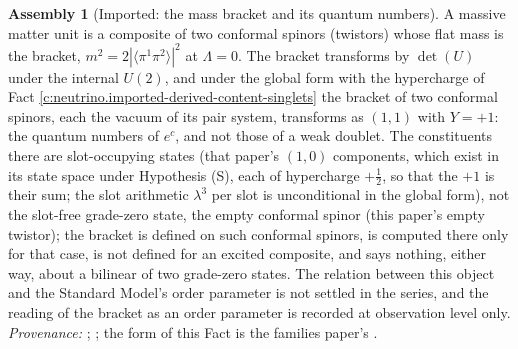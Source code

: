 \documentclass[11pt]{article}
\theoremstyle{definition}
\newtheorem{assembled}[theorem]{Assembly}
\theoremstyle{plain}
\newcommand{\changedmark}[2]{\marginpar{\raggedright\scriptsize\color{#1}#2}}
\providecommand{\br}{}\renewcommand{\br}[1]{\langle #1\rangle}
\begin{document}
\begin{assembled}[Imported: the mass bracket and its quantum numbers]\label{c:neutrino.imported-mass-bracket-quantum-numbers}
\changedmark{gray}{reworded}
A massive matter unit is a composite of two conformal spinors (twistors) whose flat mass is the bracket, $m^{2} = 2|\br{\pi^{1}\pi^{2}}|^{2}$ at $\Lambda = 0$. The bracket transforms by $\det(U)$ under the internal $U(2)$, and under the global form with the hypercharge of Fact \ref{c:neutrino.imported-derived-content-singlets} the bracket of two conformal spinors, each the vacuum of its pair system, transforms as $(1,1)$ with $Y = +1$: the quantum numbers of $e^{c}$, and not those of a weak doublet. The constituents there are slot-occupying states (that paper's $(1,0)$ components, which exist in its state space under Hypothesis (S), each of hypercharge $+\tfrac12$, so that the $+1$ is their sum; the slot arithmetic $\lambda^{3}$ per slot is unconditional in the global form), not the slot-free grade-zero state, the empty conformal spinor (this paper's empty twistor); the bracket is defined on such conformal spinors, is computed there only for that case, is not defined for an excited composite, and says nothing, either way, about a bilinear of two grade-zero states. The relation between this object and the Standard Model's order parameter is not settled in the series, and the reading of the bracket as an order parameter is recorded at observation level only. \emph{Provenance:} \cite[Props.~3.1-3.2]{ButlerT12}; \cite[Prop.~4.1]{ButlerT11}; the form of this Fact is the families paper's \cite[Fact~2.1]{ButlerT13}.
\end{assembled}
\end{document}
